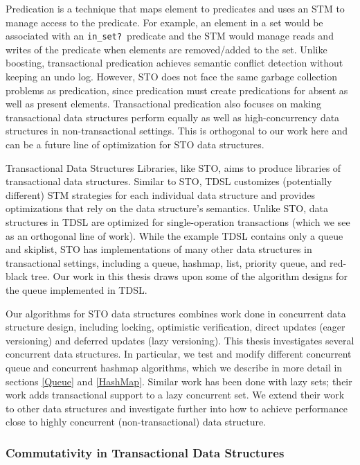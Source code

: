 Predication\cite{predication} is a technique that maps element to predicates and uses an STM to manage access to the predicate. For example, an element in a set would be associated with an \texttt{in\_set?}\ predicate and the STM would manage reads and writes of the predicate when elements are removed/added to the set. Unlike boosting, transactional predication achieves semantic conflict detection without keeping an undo log. However, STO does not face the same garbage collection problems as predication, since predication must create predications for absent as well as present elements. Transactional predication also focuses on making transactional data structures perform equally as well as high-concurrency data structures in non-transactional settings. This is orthogonal to our work here and can be a future line of optimization for STO data structures.

Transactional Data Structures Libraries\cite{tdsl}, like STO, aims to produce libraries of transactional data structures. Similar to STO, TDSL customizes (potentially different) STM strategies for each individual data structure and provides optimizations that rely on the data structure's semantics. Unlike STO, data structures in TDSL are optimized for single-operation transactions (which we see as an orthogonal line of work). While the example TDSL contains only a queue and skiplist, STO has implementations of many other data structures in transactional settings, including a queue, hashmap, list, priority queue, and red-black tree. Our work in this thesis draws upon some of the algorithm designs for the queue implemented in TDSL.

Our algorithms for STO data structures combines work done in concurrent data structure design, including locking, optimistic verification, direct updates (eager versioning) and deferred updates (lazy versioning). This thesis investigates several concurrent data structures. In particular, we test and modify different concurrent queue \cite{queue1}\cite{queue2}\cite{queue3}\cite{queue4}\cite{queue5}\cite{flatcombining} and concurrent hashmap\cite{hm1}\cite{hm2}\cite{hm3}\cite{chm} algorithms, which we describe in more detail in sections \ref{Queue} and \ref{HashMap}. Similar work has been done with lazy sets\cite{lazyset}; their work adds transactional support to a lazy concurrent set. We extend their work to other data structures and investigate further into how to achieve performance close to highly concurrent (non-transactional) data structure.

\subsubsection{Commutativity in Transactional Data Structures}

